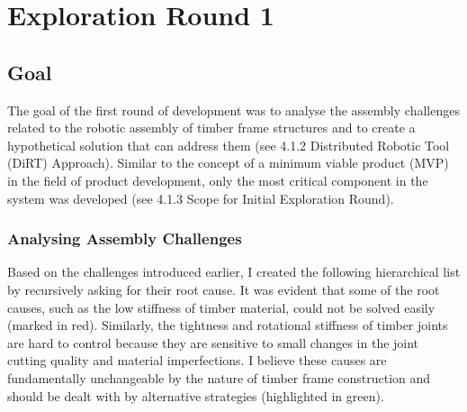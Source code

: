 \chapter{Exploration Round 1}
\label{cha:exploration_round_1}

\section{Goal}

The goal of the first round of development was to analyse the assembly challenges related to the robotic assembly of timber frame structures and to create a hypothetical solution that can address them (see 4.1.2 Distributed Robotic Tool (DiRT) Approach). Similar to the concept of a minimum viable product (MVP) in the field of product development, only the most critical component in the system was developed (see 4.1.3 Scope for Initial Exploration Round).
\subsection{Analysing Assembly Challenges}

Based on the challenges introduced earlier, I created the following hierarchical list by recursively asking for their root cause. It was evident that some of the root causes, such as the low stiffness of timber material, could not be solved easily (marked in red). Similarly, the tightness and rotational stiffness of timber joints are hard to control because they are sensitive to small changes in the joint cutting quality and material imperfections. I believe these causes are fundamentally unchangeable by the nature of timber frame construction and should be dealt with by alternative strategies (highlighted in green). 


